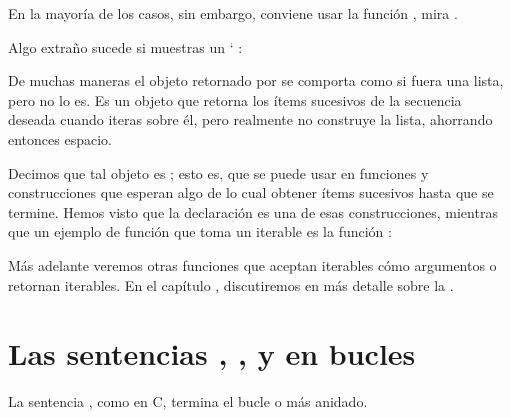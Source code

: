 \documentclass[a5paper,10pt,spanish]{sphinxmanual}
\begin{document}
\sphinxAtStartPar
En la mayoría de los casos, sin embargo, conviene usar la función , mira {\hyperref[\detokenize{tutorial/datastructures:tut-loopidioms}]{}}.

\sphinxAtStartPar
Algo extraño sucede si muestras un `    :

\begin{sphinxVerbatim}[commandchars=\\\{\}]
\end{sphinxVerbatim}

\sphinxAtStartPar
De muchas maneras el objeto retornado por  se comporta como si fuera una lista, pero no lo es. Es un objeto que retorna los ítems sucesivos de la secuencia deseada cuando iteras sobre él, pero realmente no construye la lista, ahorrando entonces espacio.

\sphinxAtStartPar
Decimos que tal objeto es {\hyperref[\detokenize{glossary:term-iterable}]{}}; esto es, que se puede usar en funciones y construcciones que esperan algo de lo cual obtener ítems sucesivos hasta que se termine. Hemos visto que la declaración  es una de esas construcciones, mientras que un ejemplo de función que toma un iterable es la función :

\begin{sphinxVerbatim}[commandchars=\\\{\}]
  
\end{sphinxVerbatim}

\sphinxAtStartPar
Más adelante veremos otras funciones que aceptan iterables cómo argumentos o retornan iterables. En el capítulo {\hyperref[\detokenize{tutorial/datastructures:tut-structures}]{}}, discutiremos en más detalle sobre la .


\section{Las sentencias , , y  en bucles}
\label{\detokenize{tutorial/controlflow:break-and-continue-statements-and-else-clauses-on-loops}}\label{\detokenize{tutorial/controlflow:tut-break}}
\sphinxAtStartPar
La sentencia , como en C, termina el bucle  o  más anidado.
\end{document}
